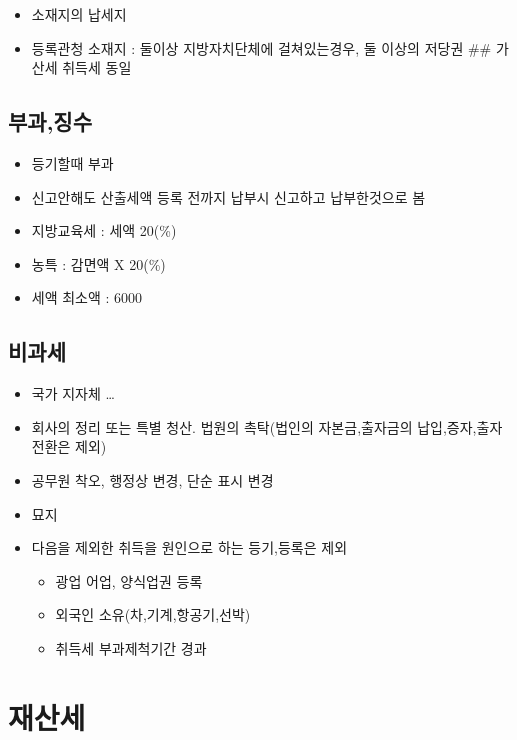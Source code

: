 \documentclass{oblivoir}
\begin{document}
\begin{multicols}{2}
\begin{itemize}
\itemsep1pt\parskip0pt
\item
  소재지의 납세지
\item
  등록관청 소재지 : 둘이상 지방자치단체에 걸쳐있는경우, 둘 이상의 저당권
  \#\# 가산세 취득세 동일
\end{itemize}

\subsection{부과,징수}\label{uxbd80uxacfcuxc9d5uxc218}

\begin{itemize}
\item
  등기할때 부과
\item
  신고안해도 산출세액 등록 전까지 납부시 신고하고 납부한것으로 봄
\item
  지방교육세 : 세액 20(\%)
\item
  농특 : 감면액 X 20(\%)
\item
  세액 최소액 : 6000
\end{itemize}

\subsection{비과세}\label{uxbe44uxacfcuxc138-1}

\begin{itemize}
\itemsep1pt\parskip0pt
\item
  국가 지자체 \ldots{}
\item
  회사의 정리 또는 특별 청산. 법원의 촉탁(법인의 자본금,출자금의
  납입,증자,출자전환은 제외)
\item
  공무원 착오, 행정상 변경, 단순 표시 변경
\item
  묘지
\item
  다음을 제외한 취득을 원인으로 하는 등기,등록은 제외

  \begin{itemize}
  \itemsep1pt\parskip0pt
  \item
    광업 어업, 양식업권 등록
  \item
    외국인 소유(차,기계,항공기,선박)
  \item
    취득세 부과제척기간 경과
  \end{itemize}
\end{itemize}

\section{재산세}\label{uxc7acuxc0b0uxc138}


\end{multicols}
\end{document}
